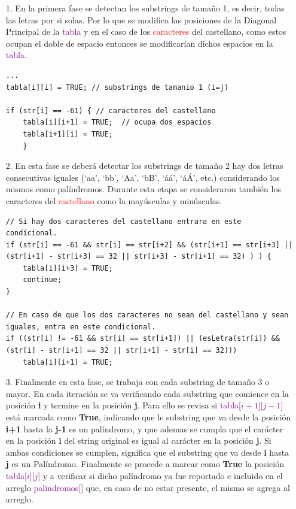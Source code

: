 \documentclass[12pt,letterpaper]{article}
\begin{document}
\begin{enumerate}
  \item[1.] En la primera fase se detectan los substrings de tamaño 1, es decir, todas las letras por si solas. Por lo que se modifica las posiciones de la  Diagonal Principal de la \textcolor{purple}{tabla} y en el caso de los \textcolor{red}{caracteres} del castellano, como estos ocupan el doble de espacio entonces se modificarían dichos espacios en la \textcolor{purple}{tabla}.

\clearpage

\begin{lstlisting}[style=C]
...
tabla[i][i] = TRUE; // substrings de tamanio 1 (i=j)

if (str[i] == -61) { // caracteres del castellano
	tabla[i][i+1] = TRUE;  // ocupa dos espacios
	tabla[i+1][i] = TRUE;
    }
\end{lstlisting}

  \item[2.] En esta fase se deberá detectar los substrings de tamaño 2 hay dos letras consecutivas iguales (`aa', `bb', `Aa', `bB', `áá', `áÁ', etc.) considerando los mismos como palíndromos. Durante esta etapa se consideraron también los caracteres del \textcolor{red}{castellano} como la mayúsculas y minúsculas.

\begin{lstlisting}[style=C]
// Si hay dos caracteres del castellano entrara en este condicional.
if (str[i] == -61 && str[i] == str[i+2] && (str[i+1] == str[i+3] || (str[i+1] - str[i+3] == 32 || str[i+3] - str[i+1] == 32) ) ) {
	tabla[i][i+3] = TRUE;
	continue;
}

// En caso de que los dos caracteres no sean del castellano y sean iguales, entra en este condicional. 
if ((str[i] != -61 && str[i] == str[i+1]) || (esLetra(str[i]) && (str[i] - str[i+1] == 32 || str[i+1] - str[i] == 32)))
	tabla[i][i+1] = TRUE;
\end{lstlisting}
  \item[3.] Finalmente en esta fase, se trabaja con cada substring de tamaño 3 o mayor. En cada iteración se va verificando cada substring que comience en la posición \textbf{i} y termine en la posición \textbf{j}. Para ello se revisa si \textcolor{purple}{tabla[$i+1$][$j-1$]} está marcada como \textbf{True}, indicando que le substring que va desde la posición \textbf{i+1} hasta la \textbf{j-1} es un palíndromo, y que ademas se cumpla que el carácter en la posición \textbf{i} del string original es igual al carácter en la posición \textbf{j}. Si ambas condiciones se cumplen, significa que el substring que va desde \textbf{i} hasta \textbf{j} es un Palíndromo. Finalmente se procede a marcar como \textbf{True} la posición \textcolor{purple}{tabla[$i$][$j$]} y a verificar si dicho palíndromo ya fue reportado e incluido en el arreglo \textcolor{purple}{palindromos[]} que, en caso de no estar presente, el mismo se agrega al arreglo.
 
\end{enumerate}
\end{document}

